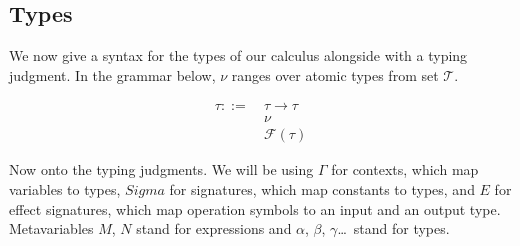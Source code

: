 \documentclass{article}
\begin{document}
\subsection{Types}

We now give a syntax for the types of our calculus alongside with a typing
judgment. In the grammar below, $\nu$ ranges over atomic types from set
$\mathcal{T}$.

\begin{align*}
  \tau ::= \
  & \tau \to \tau \\
  & \nu \\
  & \mathcal{F}(\tau)
\end{align*}

Now onto the typing judgments. We will be using $\Gamma$ for contexts,
which map variables to types, $Sigma$ for signatures, which map constants
to types, and $E$ for effect signatures, which map operation symbols to an
input and an output type. Metavariables $M$, $N$ stand for expressions and
$\alpha$, $\beta$, $\gamma$\ldots\ stand for types.
\end{document}
